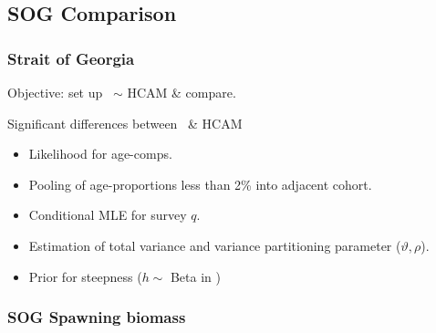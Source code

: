 \subsection{SOG Comparison} %
\label{sub:sog_comparison}
\begin{frame}[t]\frametitle{Strait of Georgia}
	Objective: set up \iscam\ $\sim$ HCAM \& compare.
	\begin{alertblock}
		{Significant differences between \iscam\ \& HCAM}
		\begin{itemize}
			\item<+-> Likelihood for age-comps.
			\item<1-> Pooling of age-proportions less than 2\% into adjacent cohort.
			\item<+-> Conditional MLE for survey $q$.
			\item<+-> Estimation of total variance and variance partitioning parameter ($\vartheta, \rho$).
			\item<+-> Prior for steepness ($h \sim$ Beta in \iscam)
		\end{itemize}
	\end{alertblock}
\end{frame}
%
\begin{frame}[c]\frametitle{SOG Spawning biomass}
	
	
\end{frame}

